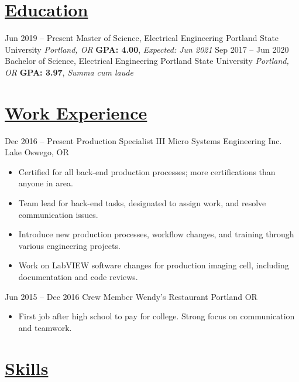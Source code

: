 \documentclass[letterpaper]{moderncv}        %
\begin{document}
\makecvtitle
\vspace*{-.8cm}
    
\section{\underline{Education}}

\cventry
{Jun 2019 -- Present}
{Master of Science, Electrical Engineering}
{Portland State University}
{\textit{Portland, OR}}
{}
{\textbf{GPA: 4.00}, \textit{Expected: Jun 2021}}
{}
\cventry
{Sep 2017 -- Jun 2020}
{Bachelor of Science, Electrical Engineering}
{Portland State University}
{\textit{Portland, OR}}
{}
{\textbf{GPA: 3.97}, \textit{Summa cum laude}}
{}

\section{\underline{Work Experience}}
\cventry
{Dec 2016 -- Present}
{Production Specialist III}
{Micro Systems Engineering Inc.}
{Lake Oswego, OR}
{}
{\begin{itemize}%
		\item Certified for all back-end production processes; more certifications than anyone in area.
		\item Team lead for back-end tasks, designated to assign work, and resolve communication issues.
		\item Introduce new production processes, workflow changes, and training through various engineering projects.
		\item Work on LabVIEW software changes for production imaging cell, including documentation and code reviews.
	\end{itemize}}
	
\cventry
{Jun 2015 -- Dec 2016}
{Crew Member}
{Wendy's Restaurant}
{Portland OR}
{}
{\begin{itemize}%
		\item First job after high school to pay for college. Strong focus on communication and teamwork.
	\end{itemize}}

\section{\underline{Skills}}
\end{document}

